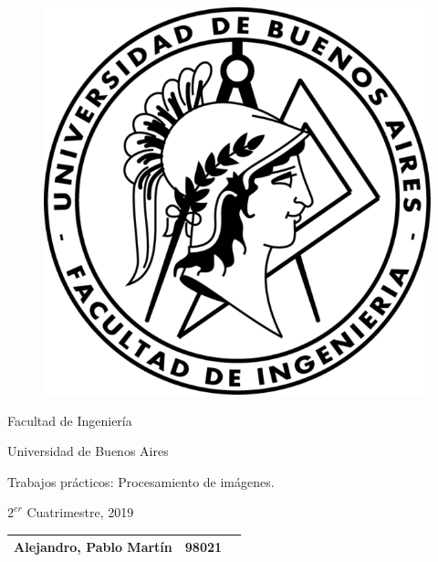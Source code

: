 \vspace*{0.10in}


\begin{figure}[htp]
				\begin{center}
					\includegraphics{imagenes/fiuba.png} 
				\end{center}
			\end{figure} 
            
\begin{center}
	\Huge{Facultad de Ingeniería}\\
    		\vspace{1.5mm}

	\Huge{Universidad de Buenos Aires}
    
    		\vspace{1.5mm}

    
    \huge{Trabajos prácticos: Procesamiento de imágenes.}
	
		\vspace{3mm}


\vspace{3mm}


\vspace{3mm}

\Large $2^{er}$ Cuatrimestre, 2019 \\
\vspace{3mm}

\begin{tabular}{l c r}
\hline
\hline
\large{Alejandro, Pablo Martín} & \hspace{10mm}98021 & \hspace{10mm}{pabloale96@gmail.com} \\
\hline
\hline
\end{tabular}


\end{center}